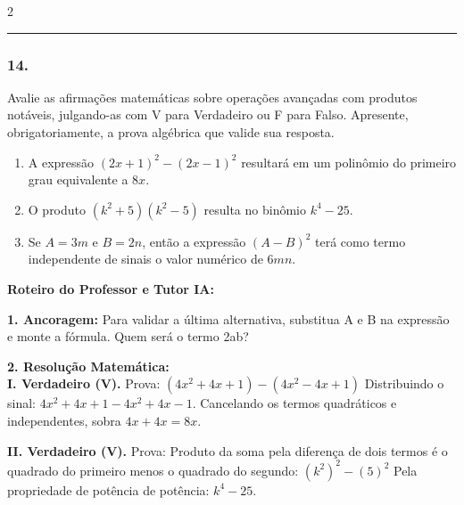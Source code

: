 \begin{multicols*}{2}
\noindent\textcolor{CorLinha}{\rule{\linewidth}{0.5pt}} 
\par\vspace{\espacoPreQuestao}
\subsubsection*{14.} 
\begin{enunciadoLiteral}
Avalie as afirmações matemáticas sobre operações avançadas com produtos notáveis, julgando-as com V para Verdadeiro ou F para Falso. Apresente, obrigatoriamente, a prova algébrica que valide sua resposta.

\begin{enumerate}[label=\Roman*., itemsep=\espacoAlt]
    \item A expressão $ (2x + 1)^2 - (2x - 1)^2 $ resultará em um polinômio do primeiro grau equivalente a $ 8x $.
    \item O produto $ (k^2 + 5)(k^2 - 5) $ resulta no binômio $ k^4 - 25 $.
    \item Se $ A = 3m $ e $ B = 2n $, então a expressão $ (A - B)^2 $ terá como termo independente de sinais o valor numérico de $ 6mn $.
\end{enumerate}
\end{enunciadoLiteral}

\ifgabarito
    \begin{tcolorbox}[colback=CorTitUm!5, colframe=CorTitUm, boxrule=1pt, arc=4pt, left=6pt, right=6pt, top=6pt, bottom=6pt]
    \small\textbf{\textcolor{CorTitUm}{Roteiro do Professor e Tutor IA:}}\par\vspace{0.1cm}
    \color{CinzaEscuro}
    \textbf{1. Ancoragem:} Para validar a última alternativa, substitua A e B na expressão e monte a fórmula. Quem será o termo 2ab?\par\vspace{0.1cm}
    \textbf{2. Resolução Matemática:}\\
    \textbf{I. Verdadeiro (V).}
    Prova: $ (4x^2 + 4x + 1) - (4x^2 - 4x + 1) $
    Distribuindo o sinal: $ 4x^2 + 4x + 1 - 4x^2 + 4x - 1 $.
    Cancelando os termos quadráticos e independentes, sobra $ 4x + 4x = 8x $.
    
    \textbf{II. Verdadeiro (V).}
    Prova: Produto da soma pela diferença de dois termos é o quadrado do primeiro menos o quadrado do segundo:
    $ (k^2)^2 - (5)^2 $
    Pela propriedade de potência de potência: $ k^4 - 25 $.
    

\end{tcolorbox}
\end{multicols*}

